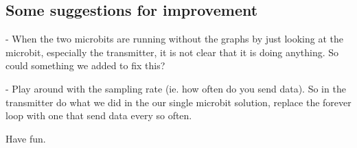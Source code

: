 \subsection{Some suggestions for improvement}

-            When the two microbits are running without the graphs by just looking at the microbit, especially the transmitter, it is not clear that it is doing anything. So could something we added to fix this?

-            Play around with the sampling rate (ie. how often do you send data). So in the transmitter do what we did in the our single microbit solution, replace the forever loop with one that send data every so often.

Have fun.

